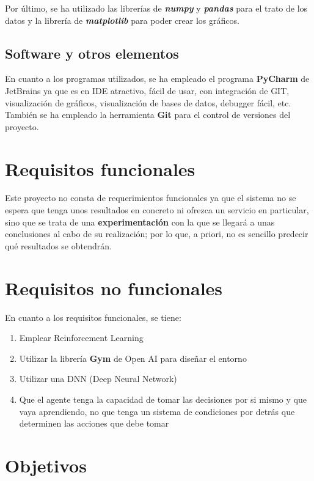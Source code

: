 Por último, se ha utilizado las librerías de \textbf{\textit{numpy}} y \textbf{\textit{pandas}} para el trato de los datos y la librería de \textbf{\textit{matplotlib}} para poder crear los gráficos. 

\subsection{Software y otros elementos} 

En cuanto a los programas utilizados, se ha empleado el programa \textbf{PyCharm} de JetBrains ya que es en IDE atractivo, fácil de usar, con integración de GIT, visualización de gráficos, visualización de bases de datos, debugger fácil, etc. \\

También se ha empleado la herramienta \textbf{Git} para el control de versiones del proyecto. 

\section{Requisitos funcionales}

Este proyecto no consta de requerimientos funcionales ya que el sistema no se espera que tenga unos resultados en concreto ni ofrezca un servicio en particular, sino que se trata de una \textbf{experimentación} con la que se llegará a unas conclusiones al cabo de su realización; por lo que, a priori, no es sencillo predecir qué resultados se obtendrán. 
\section{Requisitos no funcionales}

En cuanto a los requisitos funcionales, se tiene: 

\begin{enumerate}
    \item Emplear Reinforcement Learning
    \item Utilizar la librería \textbf{Gym} de Open AI para diseñar el entorno 
    \item Utilizar una DNN (Deep Neural Network) 
    \item Que el agente tenga la capacidad de tomar las decisiones por si mismo y que vaya aprendiendo, no que tenga un sistema de condiciones por detrás que determinen las acciones que debe tomar
\end{enumerate}

\section{Objetivos}

